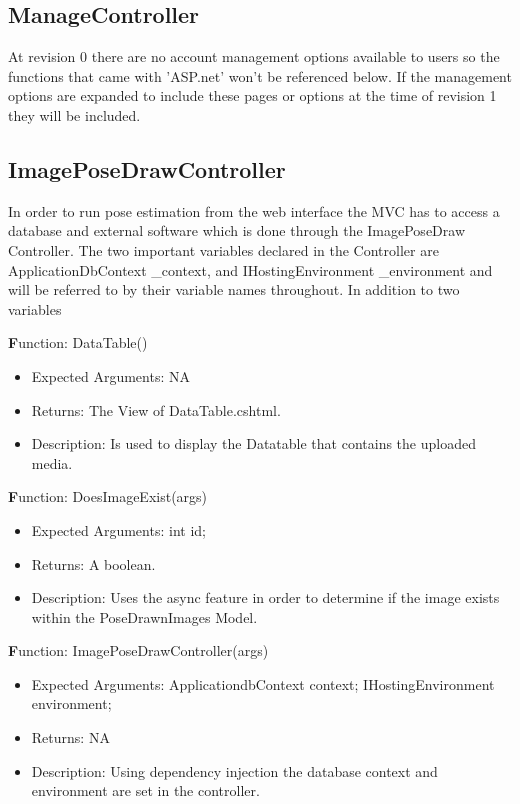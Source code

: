 \documentclass{scrreprt}
\begin{document}
\subsection{ManageController}
At revision 0 there are no account management options available to users so the functions that came with 'ASP.net' won't be referenced below. If the management options are expanded to include these pages or options at the time of revision 1 they will be included.

\subsection{ImagePoseDrawController}
In order to run pose estimation from the web interface the MVC has to access a database and external software which is done through the ImagePoseDraw Controller. The two important variables declared in the Controller are ApplicationDbContext \_context, and IHostingEnvironment \_environment and will be referred to by their variable names throughout. In addition to two variables 

  \textbf Function: DataTable()
  \begin{itemize}
    \item Expected Arguments:
    NA
    \item Returns:
    The View of DataTable.cshtml.
    \item Description:
    Is used to display the Datatable that contains the uploaded media.
  \end{itemize}

  \textbf Function: DoesImageExist(args)
  \begin{itemize}
    \item Expected Arguments:
    int id;
    \item Returns:
    A boolean.
    \item Description:
    Uses the async feature in order to determine if the image exists within the PoseDrawnImages Model.
  \end{itemize}

  \textbf Function: ImagePoseDrawController(args)
  \begin{itemize}
    \item Expected Arguments:
    ApplicationdbContext context;
    IHostingEnvironment environment;
    \item Returns:
    NA
    \item Description:
    Using dependency injection the database context and environment are set in the controller.
  \end{itemize}
\end{document}
